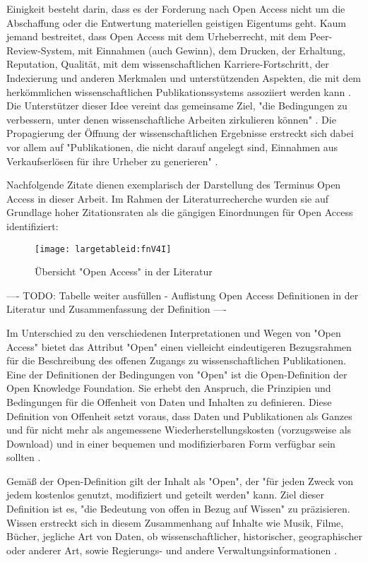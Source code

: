 Einigkeit besteht darin, dass es der Forderung nach Open Access nicht um die Abschaffung oder die Entwertung materiellen geistigen Eigentums geht. Kaum jemand bestreitet, dass Open Access mit dem Urheberrecht, mit dem Peer-Review-System, mit Einnahmen (auch Gewinn), dem Drucken, der Erhaltung, Reputation, Qualität, mit dem wissenschaftlichen Karriere-Fortschritt, der Indexierung und anderen Merkmalen und unterstützenden Aspekten, die mit dem herkömmlichen wissenschaftlichen Publikationssystems assoziiert werden kann \cite{Suber_2015}. Die Unterstützer dieser Idee vereint das gemeinsame Ziel, "die Bedingungen zu verbessern, unter denen wissenschaftliche Arbeiten zirkulieren können" \cite{Adema_2014}. Die Propagierung der Öffnung der wissenschaftlichen Ergebnisse erstreckt sich dabei vor allem auf "Publikationen, die nicht darauf angelegt sind, Einnahmen aus Verkaufserlösen für ihre Urheber zu generieren" \cite{Mueller_2010}.

Nachfolgende Zitate dienen exemplarisch der Darstellung des Terminus Open Access in dieser Arbeit. Im Rahmen der Literaturrecherche wurden sie auf Grundlage hoher Zitationsraten als die gängigen Einordnungen für Open Access identifiziert:
\begin{figure}[h!]
\texttt{[image: largetableid:fnV4I]}
\caption{Übersicht "Open Access" in der Literatur}
\end{figure}

---- TODO: Tabelle weiter ausfüllen - Auflistung Open Access Definitionen in der Literatur und Zusammenfassung der Definition ----

Im Unterschied zu den verschiedenen Interpretationen und Wegen von "Open Access" bietet das Attribut "Open" einen vielleicht eindeutigeren Bezugsrahmen für die Beschreibung des offenen Zugangs zu wissenschaftlichen Publikationen. Eine der Definitionen der Bedingungen von "Open" ist die Open-Definition der Open Knowledge Foundation. Sie erhebt den Anspruch, die Prinzipien und Bedingungen für die Offenheit von Daten und Inhalten zu definieren. Diese Definition von Offenheit setzt voraus, dass Daten und Publikationen als Ganzes und für nicht mehr als angemessene Wiederherstellungskosten (vorzugsweise als Download) und in einer bequemen und modifizierbaren Form verfügbar sein sollten \cite{Molloy_2011}.

Gemäß der Open-Definition gilt der Inhalt als "Open", der "für jeden Zweck von jedem kostenlos genutzt, modifiziert und geteilt werden" \cite{Open_Definition_2014} kann. Ziel dieser Definition ist es, "die Bedeutung von offen in Bezug auf Wissen" zu präzisieren. Wissen erstreckt sich in diesem Zusammenhang auf Inhalte wie Musik, Filme, Bücher, jegliche Art von Daten, ob wissenschaftlicher, historischer, geographischer oder anderer Art, sowie Regierungs- und andere Verwaltungsinformationen \cite{Open_Definition_2014}.

